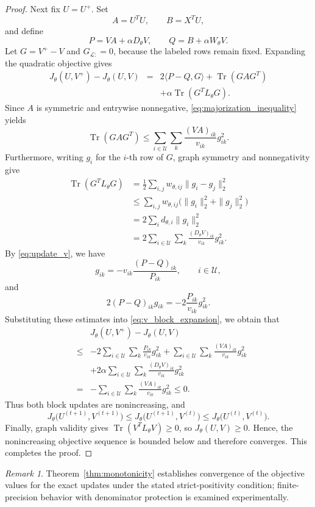 \documentclass[11pt]{article}
\theoremstyle{remark}
\newtheorem{remark}{Remark}
\newcommand{\Tr}{\operatorname{Tr}}
\begin{document}
\begin{proof}
Next fix $U=U^{+}$. Set
\[
A=U^{T}U,\qquad B=X^{T}U,
\]
and define
\[
P=VA+\alpha D_{\theta}V,
\qquad
Q=B+\alpha W_{\theta}V.
\]
Let $G=V^{+}-V$ and $G_{\mathcal L:}=0$, because the labeled rows remain fixed. Expanding the quadratic objective gives
\begin{eqnarray}
\label{eq:v_block_expansion}
J_{\theta}(U,V^{+})-J_{\theta}(U,V)
&=&2\langle P-Q,G\rangle+\Tr(GAG^{T})\nonumber\\
&&+\alpha\Tr(G^{T}L_{\theta}G).
\end{eqnarray}
Since $A$ is symmetric and entrywise nonnegative, \eqref{eq:majorization_inequality} yields
\[
\Tr(GAG^{T})\le\sum_{i\in\mathcal U}\sum_k\frac{(VA)_{ik}}{v_{ik}}g_{ik}^2.
\]
Furthermore, writing $g_i$ for the $i$-th row of $G$, graph symmetry and nonnegativity give
\[
\begin{aligned}
\Tr(G^{T}L_{\theta}G)
&=\frac12\sum_{i,j}w_{\theta,ij}\|g_i-g_j\|_2^2\\
&\le \sum_{i,j}w_{\theta,ij}
\bigl(\|g_i\|_2^2+\|g_j\|_2^2\bigr)\\
&=2\sum_i d_{\theta,i}\|g_i\|_2^2\\
&=2\sum_{i\in\mathcal U}\sum_k
\frac{(D_{\theta}V)_{ik}}{v_{ik}}g_{ik}^2.
\end{aligned}
\]
By \eqref{eq:update_v}, we have
\[
g_{ik}=-v_{ik}\frac{(P-Q)_{ik}}{P_{ik}},
\qquad i\in\mathcal U,
\]
and
\[
2(P-Q)_{ik}g_{ik}=-2\frac{P_{ik}}{v_{ik}}g_{ik}^2.
\]
Substituting these estimates into \eqref{eq:v_block_expansion}, we obtain that
\begin{eqnarray*}
&&J_{\theta}(U,V^{+})-J_{\theta}(U,V)\\
&\le& -2\sum_{i\in\mathcal U}\sum_k
\frac{P_{ik}}{v_{ik}}g_{ik}^2+\sum_{i\in\mathcal U}\sum_k
\frac{(VA)_{ik}}{v_{ik}}g_{ik}^2\\
&&+2\alpha\sum_{i\in\mathcal U}\sum_k
\frac{(D_{\theta}V)_{ik}}{v_{ik}}g_{ik}^2\\
&=&-\sum_{i\in\mathcal U}\sum_k
\frac{(VA)_{ik}}{v_{ik}}g_{ik}^2\le0.
\end{eqnarray*}
Thus both block updates are nonincreasing, and
\[
J_{\theta}\bigl(U^{(t+1)},V^{(t+1)}\bigr)
\le J_{\theta}\bigl(U^{(t+1)},V^{(t)}\bigr)
\le J_{\theta}\bigl(U^{(t)},V^{(t)}\bigr).
\]
Finally, graph validity gives $\Tr(V^{T}L_{\theta}V)\ge0$, so $J_{\theta}(U,V)\ge0$. Hence, the nonincreasing objective sequence is bounded below and therefore converges.
This completes the proof.
\end{proof}

\begin{remark}
Theorem~\ref{thm:monotonicity} establishes convergence of the objective values for the exact updates under the stated strict-positivity condition; finite-precision behavior with denominator protection is examined experimentally.
\end{remark}
\end{document}
